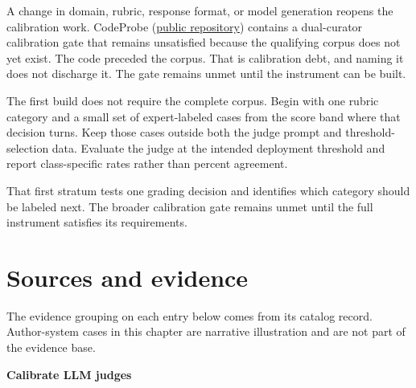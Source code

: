 A change in domain, rubric, response format, or model generation reopens the calibration work. CodeProbe (\href{https://github.com/sjarmak/codeprobe}{public repository}) contains a dual-curator calibration gate that remains unsatisfied because the qualifying corpus does not yet exist. The code preceded the corpus. That is calibration debt, and naming it does not discharge it. The gate remains unmet until the instrument can be built.

The first build does not require the complete corpus. Begin with one rubric category and a small set of expert-labeled cases from the score band where that decision turns. Keep those cases outside both the judge prompt and threshold-selection data. Evaluate the judge at the intended deployment threshold and report class-specific rates rather than percent agreement.

That first stratum tests one grading decision and identifies which category should be labeled next. The broader calibration gate remains unmet until the full instrument satisfies its requirements.

\section*{Sources and evidence}

The evidence grouping on each entry below comes from its catalog record. Author-system cases in this chapter are narrative illustration and are not part of the evidence base.

\textbf{Calibrate LLM judges}

